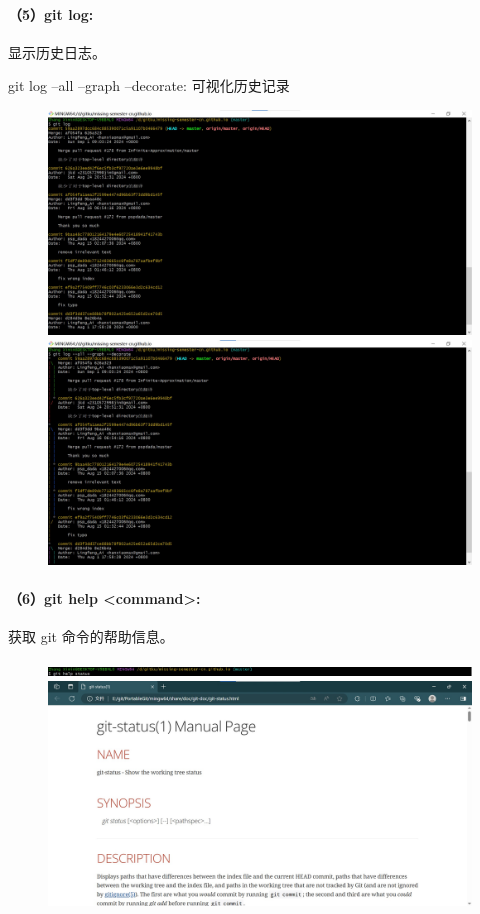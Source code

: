 \documentclass[a4paper, 12pt]{article}
\begin{document}
	
	\paragraph{（5）git log:}
	显示历史日志。
	
	git log --all --graph --decorate: 可视化历史记录	
	
	\begin{figure}[H]
	\centering
	\includegraphics[width=1\textwidth]{018.jpg}
	\includegraphics[width=1\textwidth]{019.jpg}
	\end{figure}
	
	\paragraph{（6）git help <command>:}	
	获取 git 命令的帮助信息。
	
	\begin{figure}[H]
		\centering
		\includegraphics[width=1\textwidth]{020.jpg}
		\includegraphics[width=1\textwidth]{021.jpg}
	\end{figure}
	
\end{document}
